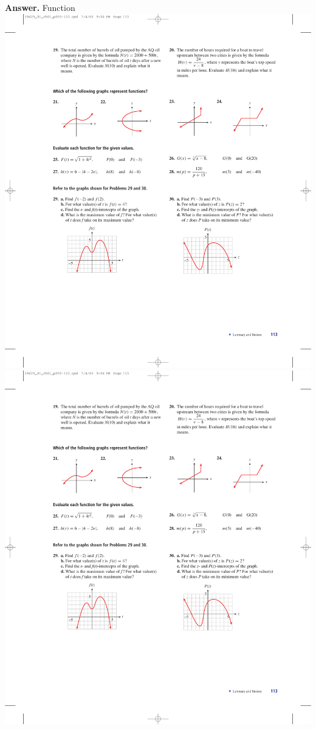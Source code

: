 \documentclass[10pt,]{book}
\theoremstyle{plain}
\theoremstyle{definition}
\theoremstyle{definition}
\theoremstyle{definition}
\theoremstyle{definition}
\numberwithin{equation}{part}
\begin{document}
\begin{exerciselist}
\begin{exercisegroup}
%
\par\smallskip
\noindent\textbf{Answer.}\hypertarget{answer-232}{}\quad
Function%
\exercise[22.]\hypertarget{exercise-418}{}\includegraphics[width=0.9\linewidth]{images/fig-chap1-rev-22}
%
\exercise[23.]\hypertarget{exercise-419}{}\includegraphics[width=0.9\linewidth]{images/fig-chap1-rev-23}

\end{exercisegroup}
\end{exerciselist}
\end{document}
